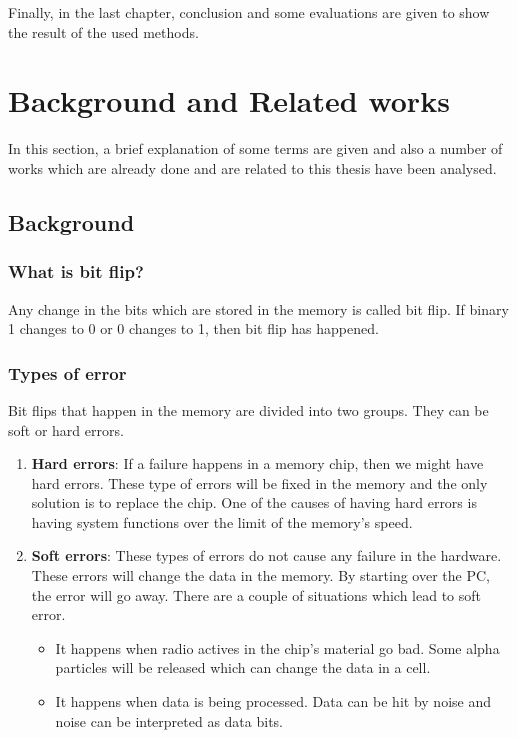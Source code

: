 \documentclass[12pt]{report}
\begin{document}
Finally, in the last chapter, conclusion and some evaluations are given to show the result of the used methods. 

\chapter{Background and Related works}

In this section, a brief explanation of some terms are given and also a number of works which are already done and are related to this thesis have been analysed.

\section{Background}

\subsection{What is bit flip?}

Any change in the bits which are stored in the memory is called bit flip. If binary 1 changes to 0 or 0 changes to 1, then bit flip has happened.

\subsection{Types of error}

Bit flips that happen in the memory are divided into two groups. They can be soft or hard errors.

\begin{enumerate}

\item \textbf{Hard errors}: If a failure happens in a memory chip, then we might have hard errors. These type of errors will be fixed in the memory and the only solution is to replace the chip. One of the causes of having hard errors is having system functions over the limit of the memory's speed. \cite{harderror}

\item \textbf{Soft errors}: These types of errors do not cause any failure in the hardware. These errors will change the data in the memory. By starting over the PC, the error will go away.\cite{softerror} There are a couple of situations which lead to soft error.
\begin{itemize}
\item It happens when radio actives in the chip's material go bad. Some alpha particles will be released which can change the data in a cell.\cite{softerror}
\item It happens when data is being processed. Data can be hit by noise and noise can be interpreted as data bits. \cite{softerror}
\end{itemize}

\end{enumerate}
\end{document}
